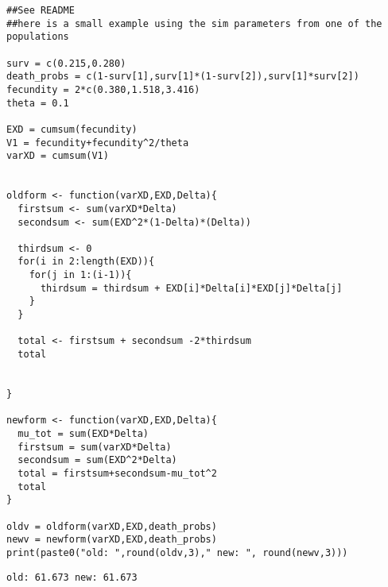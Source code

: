 \documentclass[11pt]{article}
\begin{document}
\begin{verbatim}
##See README
##here is a small example using the sim parameters from one of the populations

surv = c(0.215,0.280)
death_probs = c(1-surv[1],surv[1]*(1-surv[2]),surv[1]*surv[2])
fecundity = 2*c(0.380,1.518,3.416)
theta = 0.1

EXD = cumsum(fecundity)
V1 = fecundity+fecundity^2/theta
varXD = cumsum(V1)


oldform <- function(varXD,EXD,Delta){
  firstsum <- sum(varXD*Delta)
  secondsum <- sum(EXD^2*(1-Delta)*(Delta))

  thirdsum <- 0
  for(i in 2:length(EXD)){
    for(j in 1:(i-1)){
      thirdsum = thirdsum + EXD[i]*Delta[i]*EXD[j]*Delta[j]
    }
  }

  total <- firstsum + secondsum -2*thirdsum
  total


}

newform <- function(varXD,EXD,Delta){
  mu_tot = sum(EXD*Delta)
  firstsum = sum(varXD*Delta)
  secondsum = sum(EXD^2*Delta)
  total = firstsum+secondsum-mu_tot^2
  total
}

oldv = oldform(varXD,EXD,death_probs)
newv = newform(varXD,EXD,death_probs)
print(paste0("old: ",round(oldv,3)," new: ", round(newv,3)))
\end{verbatim}

\begin{verbatim}
old: 61.673 new: 61.673
\end{verbatim}
\end{document}
